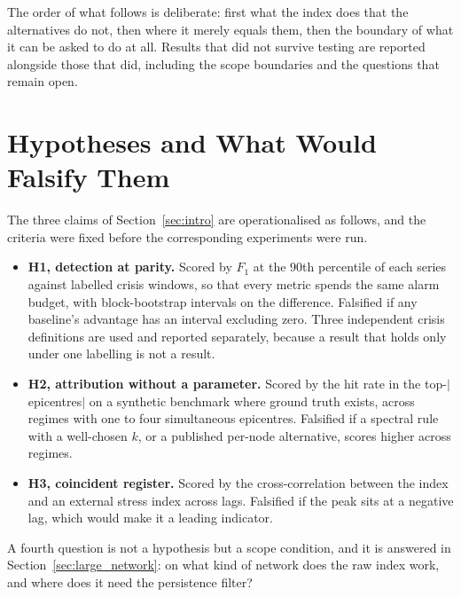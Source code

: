 \documentclass[11pt,a4paper]{article}
\begin{document}
The order of what follows is deliberate: first what the index does that the
alternatives do not, then where it merely equals them, then the boundary of what
it can be asked to do at all. Results that did not survive testing are reported
alongside those that did, including the scope boundaries and the questions that
remain open.


\section{Hypotheses and What Would Falsify Them}

The three claims of Section~\ref{sec:intro} are operationalised as follows, and
the criteria were fixed before the corresponding experiments were run.

\begin{itemize}
\item \textbf{H1, detection at parity.} Scored by $F_1$ at the 90th percentile
  of each series against labelled crisis windows, so that every metric spends
  the same alarm budget, with block-bootstrap intervals on the difference.
  Falsified if any baseline's advantage has an interval excluding zero. Three
  independent crisis definitions are used and reported separately, because a
  result that holds only under one labelling is not a result.
\item \textbf{H2, attribution without a parameter.} Scored by the hit rate in
  the top-$|$epicentres$|$ on a synthetic benchmark where ground truth exists,
  across regimes with one to four simultaneous epicentres. Falsified if a
  spectral rule with a well-chosen $k$, or a published per-node alternative,
  scores higher across regimes.
\item \textbf{H3, coincident register.} Scored by the cross-correlation between
  the index and an external stress index across lags. Falsified if the peak
  sits at a negative lag, which would make it a leading indicator.
\end{itemize}

A fourth question is not a hypothesis but a scope condition, and it is answered
in Section~\ref{sec:large_network}: on what kind of network does the raw index
work, and where does it need the persistence filter?
\end{document}
